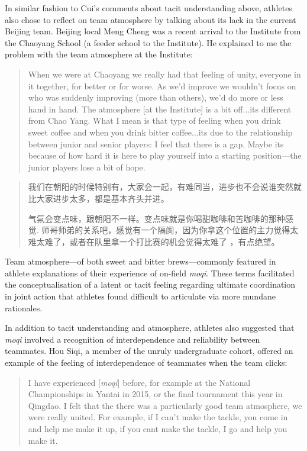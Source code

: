 \begin{CJK}{UTF8}{gbsn}
In similar fashion to Cui's comments about tacit understanding above, athletes also chose to reflect on team atmosphere by talking about its lack in the current Beijing team.  Beijing local Meng Cheng was a recent arrival to the Institute from the Chaoyang School (a feeder school to the Institute).  He explained to me the problem with the team atmosphere at the Institute:

    \begin{quote}
      When we were at Chaoyang we really had that feeling of unity, everyone in it together, for better or for worse.  As we'd improve we wouldn't focus on who was suddenly improving (more than others), we'd do more or less hand in hand.  The atmosphere [at the Institute] is a bit off...its different from Chao Yang.  What I mean is that type of feeling when you drink sweet coffee and when you drink bitter coffee...its due to the relationship between junior and senior players: I feel that there is a gap.  Maybe its because of how hard it is here to play yourself into a starting position---the junior players lose a bit of hope.
    \end{quote}

    \begin{quote}
      我们在朝阳的时候特别有，大家会一起，有难同当，进步也不会说谁突然就比大家进步太多，都是基本齐头并进。

      气氛会变点味，跟朝阳不一样。变点味就是你喝甜咖啡和苦咖啡的那种感觉. 师哥师弟的关系吧，感觉有一个隔阂，因为你拿这个位置的主力觉得太难太难了，或者在队里拿一个打比赛的机会觉得太难了 ，有点绝望。
    \end{quote}

Team atmosphere---of both sweet and bitter brews---commonly featured in athlete explanations of their experience of on-field \textit{moqi}.  These terms facilitated the conceptualisation of a latent or tacit feeling regarding ultimate coordination in joint action that athletes found difficult to articulate via more mundane rationales.

In addition to tacit understanding and atmosphere, athletes also suggested that \textit{moqi} involved a recognition of interdependence and reliability between teammates.  Hou Siqi, a member of the unruly undergraduate cohort, offered an example of the feeling of interdependence of teammates when the team clicks:

  \begin{quote}
    I have experienced [\textit{moqi}] before, for example at the National Championships in Yantai in 2015, or the final tournament this year in Qingdao.  I felt that the there was a particularly good team atmosphere, we were really united.  For example, if I can't make the tackle, you come in and help me make it up, if you cant make the tackle, I go and help you make it.
  \end{quote}


\end{CJK}
